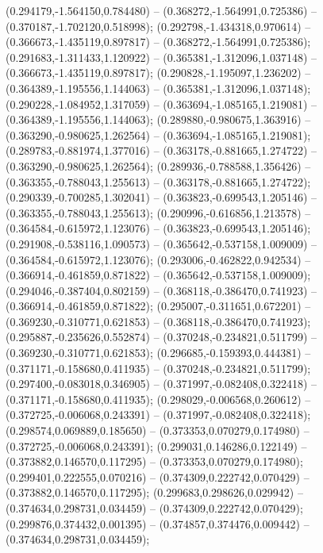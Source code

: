 (0.294179,-1.564150,0.784480) -- (0.368272,-1.564991,0.725386) -- (0.370187,-1.702120,0.518998);
 (0.292798,-1.434318,0.970614) -- (0.366673,-1.435119,0.897817) -- (0.368272,-1.564991,0.725386);
 (0.291683,-1.311433,1.120922) -- (0.365381,-1.312096,1.037148) -- (0.366673,-1.435119,0.897817);
 (0.290828,-1.195097,1.236202) -- (0.364389,-1.195556,1.144063) -- (0.365381,-1.312096,1.037148);
 (0.290228,-1.084952,1.317059) -- (0.363694,-1.085165,1.219081) -- (0.364389,-1.195556,1.144063);
 (0.289880,-0.980675,1.363916) -- (0.363290,-0.980625,1.262564) -- (0.363694,-1.085165,1.219081);
 (0.289783,-0.881974,1.377016) -- (0.363178,-0.881665,1.274722) -- (0.363290,-0.980625,1.262564);
 (0.289936,-0.788588,1.356426) -- (0.363355,-0.788043,1.255613) -- (0.363178,-0.881665,1.274722);
 (0.290339,-0.700285,1.302041) -- (0.363823,-0.699543,1.205146) -- (0.363355,-0.788043,1.255613);
 (0.290996,-0.616856,1.213578) -- (0.364584,-0.615972,1.123076) -- (0.363823,-0.699543,1.205146);
 (0.291908,-0.538116,1.090573) -- (0.365642,-0.537158,1.009009) -- (0.364584,-0.615972,1.123076);
 (0.293006,-0.462822,0.942534) -- (0.366914,-0.461859,0.871822) -- (0.365642,-0.537158,1.009009);
 (0.294046,-0.387404,0.802159) -- (0.368118,-0.386470,0.741923) -- (0.366914,-0.461859,0.871822);
 (0.295007,-0.311651,0.672201) -- (0.369230,-0.310771,0.621853) -- (0.368118,-0.386470,0.741923);
 (0.295887,-0.235626,0.552874) -- (0.370248,-0.234821,0.511799) -- (0.369230,-0.310771,0.621853);
 (0.296685,-0.159393,0.444381) -- (0.371171,-0.158680,0.411935) -- (0.370248,-0.234821,0.511799);
 (0.297400,-0.083018,0.346905) -- (0.371997,-0.082408,0.322418) -- (0.371171,-0.158680,0.411935);
 (0.298029,-0.006568,0.260612) -- (0.372725,-0.006068,0.243391) -- (0.371997,-0.082408,0.322418);
 (0.298574,0.069889,0.185650) -- (0.373353,0.070279,0.174980) -- (0.372725,-0.006068,0.243391);
 (0.299031,0.146286,0.122149) -- (0.373882,0.146570,0.117295) -- (0.373353,0.070279,0.174980);
 (0.299401,0.222555,0.070216) -- (0.374309,0.222742,0.070429) -- (0.373882,0.146570,0.117295);
 (0.299683,0.298626,0.029942) -- (0.374634,0.298731,0.034459) -- (0.374309,0.222742,0.070429);
 (0.299876,0.374432,0.001395) -- (0.374857,0.374476,0.009442) -- (0.374634,0.298731,0.034459);
